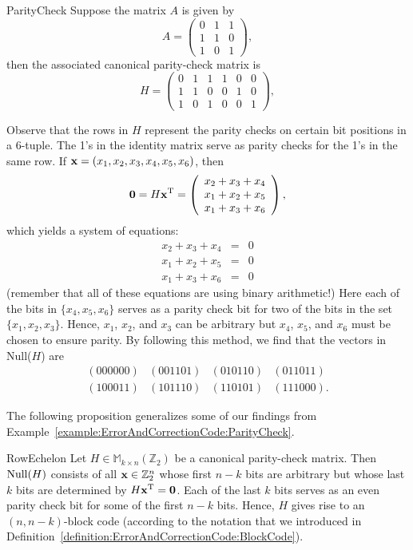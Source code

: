\begin{example}{ParityCheck}
Suppose the matrix $A$ is given by
\[
A =
\left(
\begin{array}{ccc}
0 & 1 & 1 \\
1 & 1 & 0 \\
1 & 0 & 1
\end{array}
\right),
\]
then the associated canonical parity-check matrix is
\[
H =
\left(
\begin{array}{cccccc}
0 & 1 & 1 & 1 & 0 & 0 \\
1 & 1 & 0 & 0 & 1 & 0 \\
1 & 0 & 1 & 0 & 0 & 1
\end{array}
\right),
\]

Observe that the rows in $H$  represent the parity checks on certain
bit positions in a 6-tuple. The 1's in the identity matrix serve as
parity checks for the 1's in the same row. If ${\bold x} = (x_1, x_2,
x_3, x_4, x_5, x_6)$, then 
\[
{\bold 0}
=
H{\bold x}^{\mathrm{T}}
=
\left(
\begin{array}{l}
x_2 + x_3 + x_4 \\
x_1 + x_2 + x_5\\
x_1 + x_3 + x_6
\end{array}
\right),
\]
which yields a system of equations:
\begin{eqnarray*}
x_2 + x_3 + x_4 & = & 0 \\
x_1 + x_2 + x_5 & = & 0 \\
x_1 + x_3 + x_6 & = & 0
\end{eqnarray*}
(remember that all of these equations are using binary arithmetic!) Here each of the bits in $\{x_4, x_5, x_6\}$ serves as a parity check bit for two of the bits in the set $\{x_1, x_2, x_3\}$.  Hence, $x_1$, $x_2$, and $x_3$ can be arbitrary but
$x_4$, $x_5$, and $x_6$ must be chosen to ensure parity. By following this method, we find that the vectors in Null($H$) are
\[
\begin{array}{cccc}
 (000000) & (001101) & (010110) & (011011) \\
 (100011) & (101110) & (110101) & (111000).
\end{array}
\]
\end{example}

The following proposition generalizes some of our findings from Example~\ref{example:ErrorAndCorrectionCode:ParityCheck}.

\begin{prop}{RowEchelon}
Let $H \in \mathbb{M}_{k \times n}(\mathbb{Z}_2)$ be a canonical
parity-check matrix. Then ${\rm Null}(H)$ consists of all 
${\bold x} \in {\Bbb
Z}_2^n$ whose first $n-k$ bits are arbitrary but whose last $k$ bits
are determined by $H{\bold x}^{\mathrm{T}} = {\bold 0}$. Each of
the last $k$ bits serves as an even parity check bit for some of the
first $n-k$ bits. Hence, $H$ gives rise to an $(n, n-k)$-block code  (according to the notation that we introduced in Definition~\ref{definition:ErrorAndCorrectionCode:BlockCode}). 
\end{prop}

